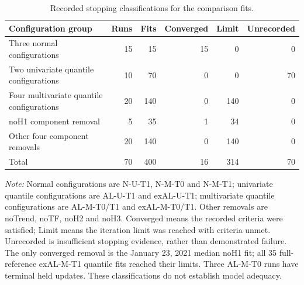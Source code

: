 \begin{table}[!htbp]
\centering
\begin{threeparttable}
\caption{Recorded stopping classifications for the comparison fits.}
\label{tab:fitting_status}
\setlength{\tabcolsep}{4pt}
\begin{tabular}{lrrrrr}
\hline
Configuration group & Runs & Fits & Converged & Limit & Unrecorded \\
\hline
Three normal configurations & 15 & 15 & 15 & 0 & 0 \\
Two univariate quantile configurations & 10 & 70 & 0 & 0 & 70 \\
Four multivariate quantile configurations & 20 & 140 & 0 & 140 & 0 \\
noH1 component removal & 5 & 35 & 1 & 34 & 0 \\
Other four component removals & 20 & 140 & 0 & 140 & 0 \\
\hline
Total & 70 & 400 & 16 & 314 & 70 \\
\hline
\end{tabular}
\begin{tablenotes}\footnotesize
\item \textit{Note:} Normal configurations are N-U-T1, N-M-T0 and N-M-T1; univariate quantile configurations are AL-U-T1 and exAL-U-T1; multivariate quantile configurations are AL-M-T0/T1 and exAL-M-T0/T1. Other removals are noTrend, noTF, noH2 and noH3. Converged means the recorded criteria were satisfied; Limit means the iteration limit was reached with criteria unmet. Unrecorded is insufficient stopping evidence, rather than demonstrated failure. The only converged removal is the January 23, 2021 median noH1 fit; all 35 full-reference exAL-M-T1 quantile fits reached their limits. Three AL-M-T0 runs have terminal held updates. These classifications do not establish model adequacy.
\end{tablenotes}
\end{threeparttable}
\end{table}
